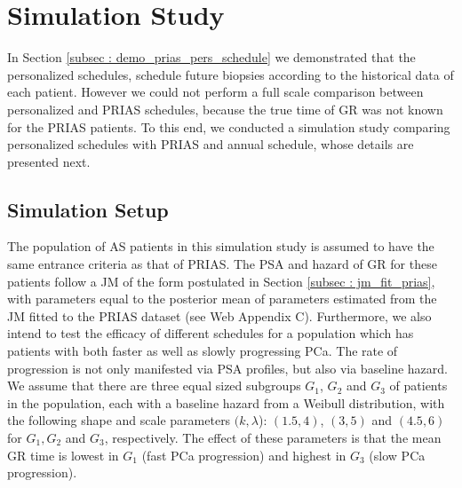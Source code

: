 \section{Simulation Study}
\label{sec: simulation_study}
In Section \ref{subsec : demo_prias_pers_schedule} we demonstrated that the personalized schedules, schedule future biopsies according to the historical data of each patient. However we could not perform a full scale comparison between personalized and PRIAS schedules, because the true time of GR was not known for the PRIAS patients. To this end, we conducted a simulation study comparing personalized schedules with PRIAS and annual schedule, whose details are presented next.

\subsection{Simulation Setup}
\label{subsec : simulation_setup}
The population of AS patients in this simulation study is assumed to have the same entrance criteria as that of PRIAS. The PSA and hazard of GR for these patients follow a JM of the form postulated in Section \ref{subsec : jm_fit_prias}, with parameters equal to the posterior mean of parameters estimated from the JM fitted to the PRIAS dataset (see Web Appendix C). Furthermore, we also intend to test the efficacy of different schedules for a population which has patients with both faster as well as slowly progressing PCa. The rate of progression is not only manifested via PSA profiles, but also via baseline hazard. We assume that there are three equal sized subgroups $G_1$, $G_2$ and $G_3$ of patients in the population, each with a baseline hazard from a Weibull distribution, with the following shape and scale parameters $(k, \lambda$): $(1.5, 4)$, $(3, 5)$ and $(4.5, 6)$ for $G_1, G_2$ and $G_3$, respectively. The effect of these parameters is that the mean GR time is lowest in $G_1$ (fast PCa progression) and highest in $G_3$ (slow PCa progression).

